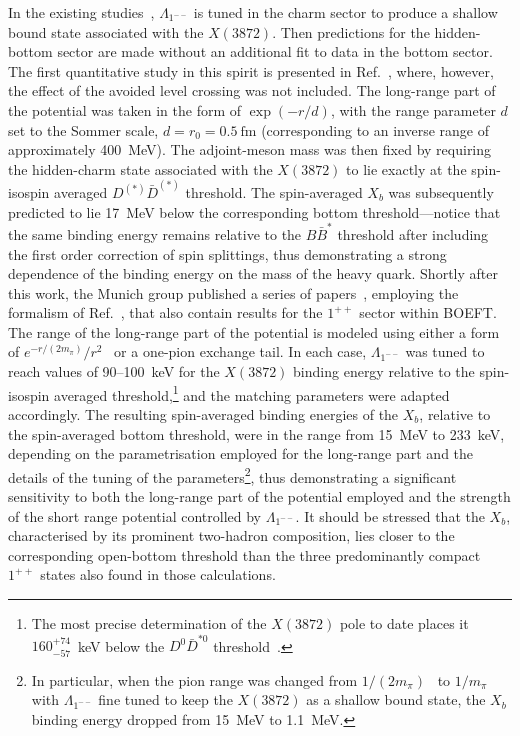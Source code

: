 \documentclass[aps,prd,showpacs,amsmath,twocolumn,superscriptaddress,floatfix,nofootinbib,notitlepage]{revtex4-2}
\newcommand{\X}{X(3872)}
\newcommand{\Xb}{X_b}
\begin{document}
In the existing studies~\cite{Braaten:2024tbm,Brambilla:2024imu,Brambilla:2026zfw,Brambilla:2026jqz}, $\Lambda_{1^{--}}$ is tuned in the charm sector to produce a shallow bound state associated with the $\X$. Then predictions for the hidden-bottom sector are made without an additional fit to data in the bottom sector. 
The first quantitative study 
in this spirit is presented 
 in Ref.~\cite{Braaten:2024tbm}, where, however, the
effect of the avoided level crossing was not included.
The long-range part of the potential was taken in the form of $\exp(-r/d)$, with the range parameter $d$ set to the Sommer scale, $d=r_0=0.5~\mathrm{fm}$ (corresponding to an inverse range of approximately 400~MeV). The adjoint-meson mass was then fixed by requiring the hidden-charm state associated with the $\X$ to lie exactly at the spin-isospin averaged $D^{(*)}\bar{D}^{(*)}$ threshold. The spin-averaged $\Xb$ was subsequently predicted to lie 17~MeV below the corresponding bottom threshold---notice that the same binding energy remains relative to the $B\bar B^*$ threshold after including the first order correction of spin splittings, thus demonstrating a strong dependence of the binding energy on the mass of the heavy quark. 
Shortly after this work, the Munich group published a series of papers~\cite{Brambilla:2024imu,Brambilla:2026zfw,Brambilla:2026jqz},
employing the formalism of Ref.~\cite{Berwein:2024ztx}, that also contain results
for the $1^{++}$ sector within BOEFT.
The range of the long-range part
of the potential is modeled 
using either a form of $e^{-r/(2m_\pi)}/r^2$~\cite{Brambilla:2024imu} or a one-pion exchange tail. In each case, $\Lambda_{1^{--}}$
was tuned to reach values of 90--100~keV for the $\X$
binding energy relative to the spin-isospin averaged threshold,\footnote{The most precise determination of the $\X$ pole to date places it $160_{-57}^{+74}$~keV below the $D^0\bar{D}^{*0}$ threshold~\cite{Ji:2025hjw}.}
and the matching parameters were adapted accordingly.
The resulting spin-averaged binding energies of the $\Xb$, relative to the spin-averaged bottom threshold,
were in the range from 15~MeV to 233~keV, depending on the parametrisation employed for the long-range part and the details of the tuning of the parameters\footnote{In particular, when the pion range was changed from $1/(2m_\pi)$~\cite{Brambilla:2024imu} 
to $1/m_\pi$~\cite{Brambilla:2026jqz}
with $\Lambda_{1^{--}}$ fine tuned
to keep the $\X$ as a shallow bound state, the $\Xb$ binding energy dropped from 15~MeV to 1.1~MeV.}, thus demonstrating a 
significant sensitivity to both the
long-range part of the potential employed and the strength of the
short range potential controlled
by $\Lambda_{1^{--}}$.
It should be stressed that 
the $\Xb$, characterised by its prominent two-hadron composition, lies closer to the corresponding open-bottom threshold than the three predominantly compact $1^{++}$ states also found in those calculations. 
\end{document}
